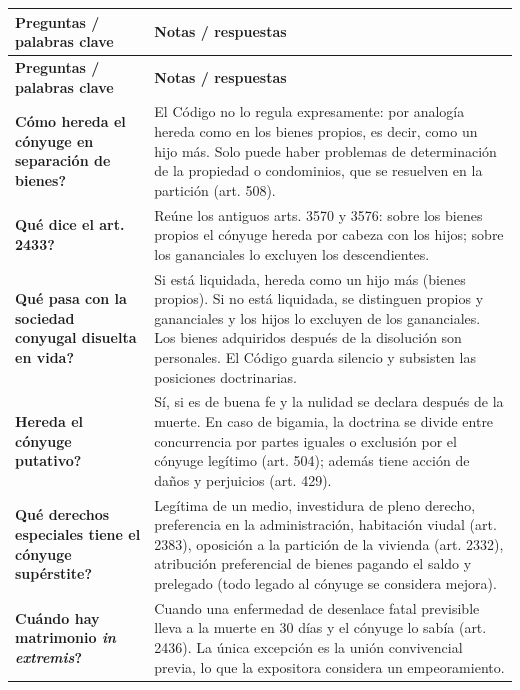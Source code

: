 \documentclass[12pt,oneside]{book}
\begin{document}
\begin{longtable}{
    >{\raggedright\arraybackslash}p{}
    >{\raggedright\arraybackslash}p{}
}
\toprule
\textbf{Preguntas / palabras clave} &
\textbf{Notas / respuestas} \\
\midrule
\endfirsthead
\toprule
\textbf{Preguntas / palabras clave} &
\textbf{Notas / respuestas} \\
\midrule
\endhead
\bottomrule
\endfoot

\textbf{\textquestiondown{}Cómo hereda el cónyuge en separación de bienes?} &
El Código no lo regula expresamente: por analogía hereda como en los bienes propios, es decir, como un hijo más. Solo puede haber problemas de determinación de la propiedad o condominios, que se resuelven en la partición (art. 508). \\[0.6em]

\textbf{\textquestiondown{}Qué dice el art. 2433?} &
Reúne los antiguos arts. 3570 y 3576: sobre los bienes propios el cónyuge hereda por cabeza con los hijos; sobre los gananciales lo excluyen los descendientes. \\[0.6em]

\textbf{\textquestiondown{}Qué pasa con la sociedad conyugal disuelta en vida?} &
Si está liquidada, hereda como un hijo más (bienes propios). Si no está liquidada, se distinguen propios y gananciales y los hijos lo excluyen de los gananciales. Los bienes adquiridos después de la disolución son personales. El Código guarda silencio y subsisten las posiciones doctrinarias. \\[0.6em]

\textbf{\textquestiondown{}Hereda el cónyuge putativo?} &
Sí, si es de buena fe y la nulidad se declara después de la muerte. En caso de bigamia, la doctrina se divide entre concurrencia por partes iguales o exclusión por el cónyuge legítimo (art. 504); además tiene acción de daños y perjuicios (art. 429). \\[0.6em]

\textbf{\textquestiondown{}Qué derechos especiales tiene el cónyuge supérstite?} &
Legítima de un medio, investidura de pleno derecho, preferencia en la administración, habitación viudal (art. 2383), oposición a la partición de la vivienda (art. 2332), atribución preferencial de bienes pagando el saldo y prelegado (todo legado al cónyuge se considera mejora). \\[0.6em]

\textbf{\textquestiondown{}Cuándo hay matrimonio \textit{in extremis}?} &
Cuando una enfermedad de desenlace fatal previsible lleva a la muerte en 30 días y el cónyuge lo sabía (art. 2436). La única excepción es la unión convivencial previa, lo que la expositora considera un empeoramiento. \\[0.6em]


\end{longtable}
\end{document}
